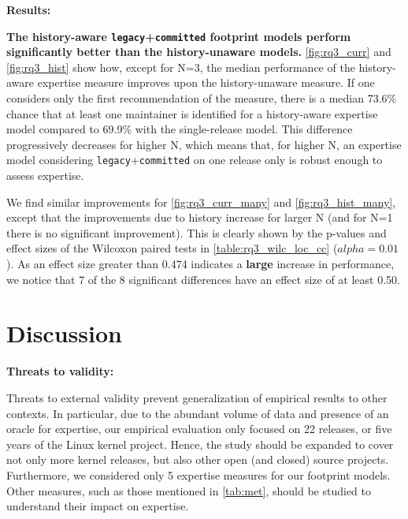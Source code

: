 {\bf Results:}

\textbf{The history-aware \texttt{legacy}+\texttt{committed} footprint models perform significantly better than the history-unaware models.} \autoref{fig:rq3_curr} and \autoref{fig:rq3_hist} show how, except for N=3, the median performance of the history-aware expertise measure improves upon the history-unaware measure. If one considers only the first recommendation of the measure, there is a median 73.6\% chance that at least one maintainer is identified for a history-aware expertise model compared to 69.9\% with the single-release model. This difference progressively decreases for higher N, which means that, for higher N, an expertise model considering \texttt{legacy}+\texttt{committed} on one release only is robust enough to assess expertise.

We find similar improvements for \autoref{fig:rq3_curr_many} and \autoref{fig:rq3_hist_many}, except that the improvements due to history increase for larger N (and for N=1 there is no significant improvement). This is clearly shown %
by the p-values and effect sizes of the Wilcoxon paired tests in \autoref{table:rq3_wilc_loc_cc} ($alpha=0.01$). As an effect size greater than 0.474 indicates a \textbf{large} increase in performance, we notice that 7 of the 8 significant differences have an effect size of at least 0.50. %


\section{Discussion}
\label{sec:discussion}

\textbf{Threats to validity:}

Threats to external validity prevent generalization of empirical results to other contexts. In particular, due to the abundant volume of data and presence of an oracle for expertise, our empirical evaluation only focused on 22 releases, or five years of the Linux kernel project. Hence, the study should be expanded to cover not only more kernel releases, but also other open (and closed) source projects. Furthermore, we considered only 5 expertise measures for our footprint models. Other measures, such as those mentioned in \autoref{tab:met}, should be studied to understand their impact on expertise.


